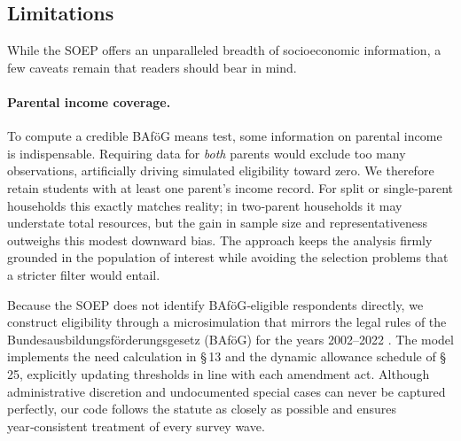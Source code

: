 \subsection{Limitations}

While the SOEP offers an unparalleled breadth of socioeconomic information, a few caveats remain that readers should bear in mind.

\paragraph{Parental income coverage.}
To compute a credible BAföG means test, some information on parental income is indispensable.  Requiring data for \emph{both} parents would exclude too many observations, artificially driving simulated eligibility toward zero.  We therefore retain students with at least one parent’s income record.  For split or single‑parent households this exactly matches reality; in two‑parent households it may understate total resources, but the gain in sample size and representativeness outweighs this modest downward bias.  The approach keeps the analysis firmly grounded in the population of interest while avoiding the selection problems that a stricter filter would entail.

Because the SOEP does not identify BAföG‑eligible respondents directly, we construct eligibility through a microsimulation that mirrors the legal rules of the Bundesausbildungsförderungsgesetz (BAföG) for the years 2002–2022 \citep{bafoeg_law,bafoeg20,bafoeg21,bafoeg22,bafoeg23,bafoeg24,bafoeg25,bafoeg26,bafoeg27,bafoeg28,bafoeg29}.  The model implements the need calculation in §\,13 and the dynamic allowance schedule of §\,25, explicitly updating thresholds in line with each amendment act.  Although administrative discretion and undocumented special cases can never be captured perfectly, our code follows the statute as closely as possible and ensures year‑consistent treatment of every survey wave.

